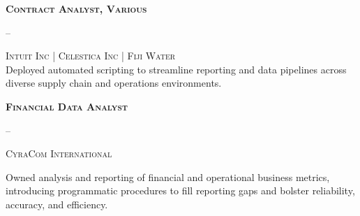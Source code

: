 {\scshape{\bfseries{\textsf{Contract Analyst, Various}}}} \hfill
    {}

\vspace{2ex}
\begin{minipage}[t]{0.195\textwidth}
    \vspace{-\topskip}
    \footnotesize\textsf{--}
\end{minipage}
\hfill
\begin{minipage}[t]{0.8\textwidth}
    \vspace{-\topskip}
    {\scshape\textsf{Intuit Inc | Celestica Inc | Fiji Water}
    }\\
    \setlength{\parskip}{1em}
    Deployed automated scripting to streamline reporting and data pipelines
    across diverse supply chain and operations environments.




\end{minipage}
\vspace{2ex}

{\scshape{\bfseries{\textsf{Financial Data Analyst}}}} \hfill
    {}

\vspace{2ex}
\begin{minipage}[t]{0.195\textwidth}
    \vspace{-\topskip}
    \footnotesize\textsf{--}

\end{minipage}
\hfill
\begin{minipage}[t]{0.8\textwidth}
    \vspace{-\topskip}     {\scshape\textsf{CyraCom International}
    }\\
    \setlength{\parskip}{1em}

    Owned analysis and reporting of financial and operational business
    metrics, introducing programmatic procedures to
    fill reporting gaps and bolster reliability, accuracy,
    and efficiency.

\end{minipage}
